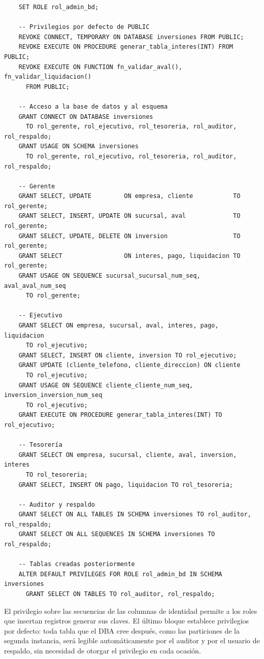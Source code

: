 \begin{verbatim}
	SET ROLE rol_admin_bd;

	-- Privilegios por defecto de PUBLIC
	REVOKE CONNECT, TEMPORARY ON DATABASE inversiones FROM PUBLIC;
	REVOKE EXECUTE ON PROCEDURE generar_tabla_interes(INT) FROM PUBLIC;
	REVOKE EXECUTE ON FUNCTION fn_validar_aval(), fn_validar_liquidacion()
	  FROM PUBLIC;

	-- Acceso a la base de datos y al esquema
	GRANT CONNECT ON DATABASE inversiones
	  TO rol_gerente, rol_ejecutivo, rol_tesoreria, rol_auditor, rol_respaldo;
	GRANT USAGE ON SCHEMA inversiones
	  TO rol_gerente, rol_ejecutivo, rol_tesoreria, rol_auditor, rol_respaldo;

	-- Gerente
	GRANT SELECT, UPDATE         ON empresa, cliente           TO rol_gerente;
	GRANT SELECT, INSERT, UPDATE ON sucursal, aval             TO rol_gerente;
	GRANT SELECT, UPDATE, DELETE ON inversion                  TO rol_gerente;
	GRANT SELECT                 ON interes, pago, liquidacion TO rol_gerente;
	GRANT USAGE ON SEQUENCE sucursal_sucursal_num_seq, aval_aval_num_seq
	  TO rol_gerente;

	-- Ejecutivo
	GRANT SELECT ON empresa, sucursal, aval, interes, pago, liquidacion
	  TO rol_ejecutivo;
	GRANT SELECT, INSERT ON cliente, inversion TO rol_ejecutivo;
	GRANT UPDATE (cliente_telefono, cliente_direccion) ON cliente
	  TO rol_ejecutivo;
	GRANT USAGE ON SEQUENCE cliente_cliente_num_seq, inversion_inversion_num_seq
	  TO rol_ejecutivo;
	GRANT EXECUTE ON PROCEDURE generar_tabla_interes(INT) TO rol_ejecutivo;

	-- Tesorería
	GRANT SELECT ON empresa, sucursal, cliente, aval, inversion, interes
	  TO rol_tesoreria;
	GRANT SELECT, INSERT ON pago, liquidacion TO rol_tesoreria;

	-- Auditor y respaldo
	GRANT SELECT ON ALL TABLES IN SCHEMA inversiones TO rol_auditor, rol_respaldo;
	GRANT SELECT ON ALL SEQUENCES IN SCHEMA inversiones TO rol_respaldo;

	-- Tablas creadas posteriormente
	ALTER DEFAULT PRIVILEGES FOR ROLE rol_admin_bd IN SCHEMA inversiones
	  GRANT SELECT ON TABLES TO rol_auditor, rol_respaldo;
\end{verbatim}

El privilegio  sobre las secuencias de las columnas de identidad permite a los roles que insertan registros generar sus claves. El último bloque establece privilegios por defecto: toda tabla que el DBA cree después, como las particiones de la segunda instancia, será legible automáticamente por el auditor y por el usuario de respaldo, sin necesidad de otorgar el privilegio en cada ocasión.

